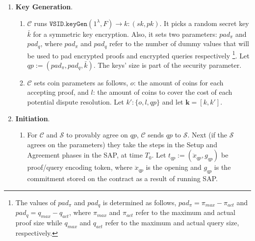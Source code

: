 \begin{enumerate}
\item \textbf{Key Generation}. 
\begin{enumerate}


\item  $\mathcal C$ runs  $\mathtt{VSID.keyGen}(1^{\lambda},F)\rightarrow k:(sk,pk)$. It picks a random secret key  $\bar{k}$ for a symmetric key encryption. Also, it sets two parameters: $pad_{\scriptscriptstyle \pi}$ and $pad_{\scriptscriptstyle q}$, where  $pad_{\scriptscriptstyle \pi}$ and $pad_{\scriptscriptstyle q}$  refer to the number of  dummy values that will be used to pad encrypted proofs and encrypted queries respectively \footnote{\scriptsize The values of  $pad_{\scriptscriptstyle \pi}$ and $pad_{\scriptscriptstyle q}$ is determined as follows, $pad_{\scriptscriptstyle \pi}=\pi_{\scriptscriptstyle max}-\pi_{\scriptscriptstyle act}$ and $pad_{\scriptscriptstyle q}=q_{\scriptscriptstyle max}-q_{\scriptscriptstyle act}$, where $\pi_{\scriptscriptstyle max}$ and $\pi_{\scriptscriptstyle act}$ refer to the maximum and actual proof size  while $q_{\scriptscriptstyle max}$ and $q_{\scriptscriptstyle act}$ refer to the maximum and actual query size, respectively.}.  Let $qp:=(pad_{\scriptscriptstyle \pi},pad_{\scriptscriptstyle q}, \bar{k})$. The keys' size is part of the security parameter. 


\item  $\mathcal C$ sets coin parameters as   follows,   $o$: the amount of coins for each accepting proof, and $l$: the amount of coins  to cover the cost of each potential dispute resolution.    Let $k':\{o,l,qp\}$ and  let $\bm{k}=[k,k']$. 


\end{enumerate}
\item \textbf{Initiation}. 
\begin{enumerate}
\item For $\mathcal C$ and $\mathcal S$ to provably agree on $qp$, $\mathcal C$ sends $qp$ to  $\mathcal S$.  Next (if the $\mathcal S$ agrees on the parameters) they take the steps in the Setup and Agreement phases in the SAP, at time $T_{\scriptscriptstyle 0}$. Let $t_{\scriptscriptstyle qp}:=(\ddot{x}_{\scriptscriptstyle qp},g_{\scriptscriptstyle qp})$ be proof/query encoding token,  where  $\ddot{x}_{\scriptscriptstyle qp}$ is the opening and $g_{\scriptscriptstyle qp}$ is the commitment stored on the contract as a result of running   SAP. 



\end{enumerate}
\end{enumerate}
